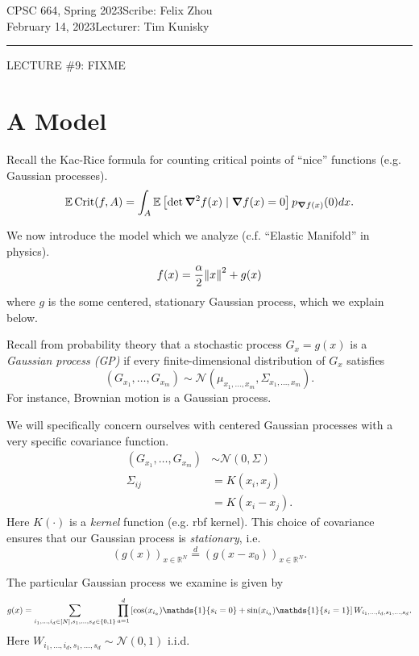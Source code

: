 \documentclass[12pt]{article}
\newcommand\coursename{CPSC 664, Spring 2023}
\newcommand\scribe{Felix Zhou}
\newcommand\lecturer{Tim Kunisky}
\newcommand\lecturedate{February 14, 2023}
\newcommand\lecturetitle{LECTURE \#9: FIXME}
\DeclarePairedDelimiter{\set}{\lbrace}{\rbrace}
\DeclareMathOperator{\Crit}{Crit}
\newcommand{\R}{\mathbb{R}}
\newcommand{\E}{\mathbb{E}}
\newcommand{\mcal}{\mathcal}
\newcommand{\ones}{\mathds{1}}
\newcommand{\eq}[1]{\stackrel{#1}{=}}
\begin{document}
\noindent \coursename \hfill Scribe: \scribe \\
\lecturedate \hfill Lecturer: \lecturer
\vspace{1em}

\hrule

\vspace{1.5em}
\begin{center}
  {\Large\lecturetitle}
\end{center}

\section{A Model}
Recall the Kac-Rice formula for counting critical points of ``nice'' functions (e.g. Gaussian processes).
\[
  \E \Crit(f, A)
  = \int_A \E\left[ \det \grad^2 f(x)\mid \grad f(x)=0 \right] p_{\grad f(x)}(0) dx.
\]

We now introduce the model which we analyze (c.f. ``Elastic Manifold'' in physics).
\[
  f(x) = \frac\alpha2 \norm{x}^2 + g(x)
\]
where $g$ is the some centered, stationary Gaussian process,
which we explain below.

Recall from probability theory that a stochastic process $G_x = g(x)$ is a \emph{Gaussian process (GP)}
if every finite-dimensional distribution of $G_x$ satisfies
\[
  (G_{x_1}, \dots, G_{x_m}) \sim \mcal N(\mu_{x_1, \dots, x_m}, \Sigma_{x_1, \dots, x_m}).
\]
For instance,
Brownian motion is a Gaussian process.

We will specifically concern ourselves with centered Gaussian processes
with a very specific covariance function.
\begin{align*}
  (G_{x_1}, \dots, G_{x_m}) &\sim \mcal N(0, \Sigma) \\
  \Sigma_{ij} &= K(x_i, x_j) \\
  &= K(x_i-x_j).
\end{align*}
Here $K(\cdot)$ is a \emph{kernel} function (e.g. rbf kernel).
This choice of covariance ensures that our Gaussian process is \emph{stationary},
i.e.
\[
  (g(x))_{x\in \R^N} \eq{d} (g(x-x_0))_{x\in \R^N}.
\]

The particular Gaussian process we examine is given by
\[
  g(x)
  = \sum_{i_1, \dots, i_d\in [N], s_1, \dots, s_d\in \set{0, 1}}
  \prod_{a=1}^d \left[ \cos(x_{i_a})\ones\set{s_i=0} + \sin(x_{i_a})\ones\set{s_i=1} \right]
  W_{i_1, \dots, i_d, s_1, \dots, s_d}.
\]
Here $W_{i_1, \dots, i_d, s_1, \dots, s_d}\sim \mcal N(0, 1)$ i.i.d.
\end{document}
